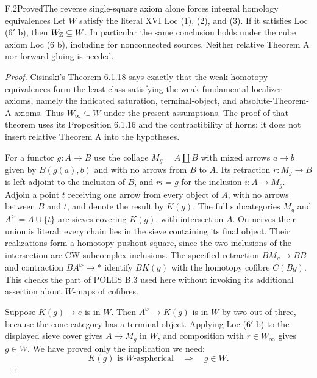 \begin{claim}{F.2}{Proved}{The reverse single-square axiom alone forces integral homology equivalences}
Let $W$ satisfy the literal XVI Loc (1), (2), and (3). If it satisfies Loc ($6'$ b), then $W_\mathbb Z\subseteq W$. In particular the same conclusion holds under the cube axiom Loc (6 b), including for nonconnected sources. Neither relative Theorem A nor forward gluing is needed.
\end{claim}
\begin{proof}
Cisinski's Theorem 6.1.18 \cite{FGHCisinski2006} says exactly that the weak homotopy equivalences form the least class satisfying the weak-fundamental-localizer axioms, namely the indicated saturation, terminal-object, and absolute-Theorem-A axioms. Thus $W_\infty\subseteq W$ under the present assumptions. The proof of that theorem uses its Proposition 6.1.16 and the contractibility of horns; it does not insert relative Theorem A into the hypotheses.

For a functor $g:A\to B$ use the collage $M_g=A\amalg B$ with mixed arrows $a\to b$ given by $B(g(a),b)$ and with no arrows from $B$ to $A$. Its retraction $r:M_g\to B$ is left adjoint to the inclusion of $B$, and $ri=g$ for the inclusion $i:A\to M_g$. Adjoin a point $t$ receiving one arrow from every object of $A$, with no arrows between $B$ and $t$, and denote the result by $K(g)$. The full subcategories $M_g$ and $A^{\triangleright}=A\cup\{t\}$ are sieves covering $K(g)$, with intersection $A$. On nerves their union is literal: every chain lies in the sieve containing its final object. Their realizations form a homotopy-pushout square, since the two inclusions of the intersection are CW-subcomplex inclusions. The specified retraction $BM_g\to BB$ and contraction $BA^{\triangleright}\to*$ identify $BK(g)$ with the homotopy cofibre $C(Bg)$. This checks the part of POLES B.3 used here without invoking its additional assertion about $W$-maps of cofibres.

Suppose $K(g)\to e$ is in $W$. Then $A^{\triangleright}\to K(g)$ is in $W$ by two out of three, because the cone category has a terminal object. Applying Loc ($6'$ b) to the displayed sieve cover gives $A\to M_g$ in $W$, and composition with $r\in W_\infty$ gives $g\in W$. We have proved only the implication we need:
\[
 K(g)\text{ is }W\text{-aspherical}\quad\Longrightarrow\quad g\in W.
\]


\end{proof}
